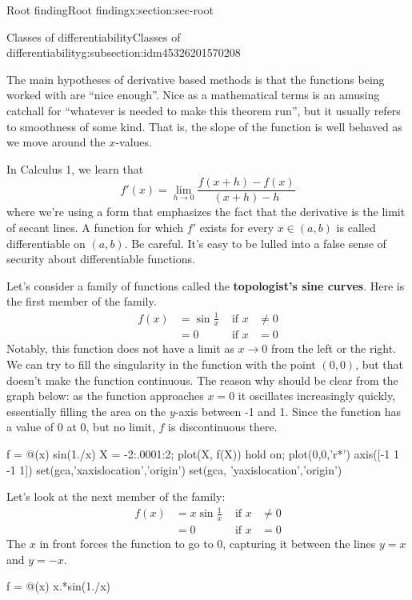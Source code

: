 \documentclass[oneside,10pt,]{article}
\newcommand{\terminology}[1]{\textbf{#1}}
\numberwithin{equation}{section}
\numberwithin{equation}{section}
\newcommand{\amp}{&}
\begin{document}
\begin{sectionptx}{Root finding}{}{Root finding}{}{}{x:section:sec-root}
\begin{subsectionptx}{Classes of differentiability}{}{Classes of differentiability}{}{}{g:subsection:idm45326201570208}
\par
The main hypotheses of derivative based methods is that the functions being worked with are ``nice enough''. Nice as a mathematical terms is an amusing catchall for ``whatever is needed to make this theorem run'', but it usually refers to smoothness of some kind. That is, the slope of the function is well behaved as we move around the \(x\)-values.%
\par
In Calculus 1, we learn that%
\begin{equation*}
f'(x) = \lim_{h\to 0} \frac{f(x + h) - f(x)}{(x + h) -h}
\end{equation*}
where we're using a form that emphasizes the fact that the derivative is the limit of secant lines. A function for which \(f'\) exists for every \(x \in (a,b)\) is called differentiable on \((a,b)\). Be careful. It's easy to be lulled into a false sense of security about differentiable functions.%
\par
Let's consider a family of functions called the \terminology{topologist's sine curves}. Here is the first member of the family.%
\begin{align*}
f(x) \amp= \sin \frac{1}{x} \amp\text{ if } x \amp\neq 0 \\
\amp = 0 \amp\text{ if } x \amp= 0
\end{align*}
Notably, this function does not have a limit as \(x \to 0\) from the left or the right. We can try to fill the singularity in the function with the point \((0,0)\), but that doesn't make the function continuous. The reason why should be clear from the graph below: as the function approaches \(x = 0\) it oscillates increasingly quickly, essentially filling the area on the \(y\)-axis between -1 and 1. Since the function has a value of 0 at 0, but no limit, \(f\) is discontinuous there.%
\begin{sageinput}
f = @(x) sin(1./x)
X = -2:.0001:2;
plot(X, f(X))
hold on;
plot(0,0,'r*')
axis([-1 1 -1 1])
set(gca,'xaxislocation','origin')
set(gca, 'yaxislocation','origin')
\end{sageinput}
Let's look at the next member of the family:%
\begin{align*}
f(x) \amp= x \sin \frac{1}{x} \amp\text{ if } x \amp\neq 0 \\
\amp = 0 \amp\text{ if } x \amp= 0
\end{align*}
The \(x\) in front forces the function to go to 0, capturing it between the lines \(y = x\) and \(y = -x\).%
\begin{sageinput}
f = @(x) x.*sin(1./x)

\end{sageinput}
\end{subsectionptx}
\end{sectionptx}
\end{document}
